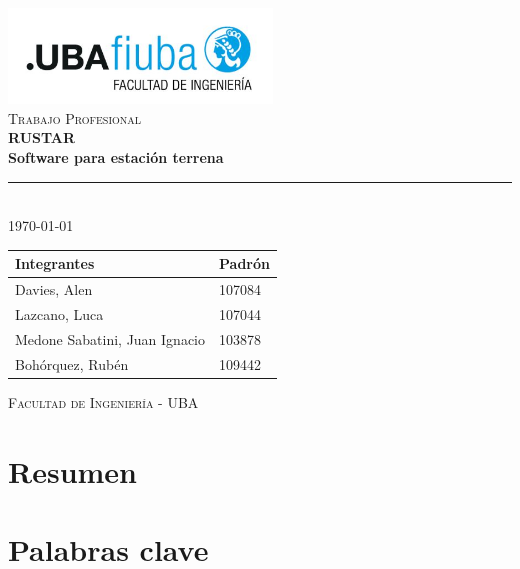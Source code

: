 \documentclass[a4paper,11pt]{article}
\begin{document}
\begin{titlepage}
\begin{center}

\includegraphics[width=7cm]{fiuba_logo.jpg} \\[2cm]

\textsc{\Large Trabajo Profesional} \\[0.5cm]
{\huge \bfseries RUSTAR \\[0.3cm]
Software para estación terrena} \\[1cm]

\rule{\linewidth}{0.4pt} \\[1cm]

{\large \today} \\[2cm]

\hspace*{-1.5cm}
\begin{tabular}{ | l | l | }
  \hline
  \textbf{Integrantes} & \textbf{Padrón} \\ \hline
  Davies, Alen & 107084 \\ \hline
  Lazcano, Luca & 107044 \\ \hline
  Medone Sabatini, Juan Ignacio & 103878 \\ \hline
  Bohórquez, Rubén & 109442 \\ \hline
\end{tabular}

\vfill

\textsc{Facultad de Ingeniería - UBA}

\end{center}
\end{titlepage}

\tableofcontents
\newpage

\section{Resumen}

\section{Palabras clave}
\end{document}
